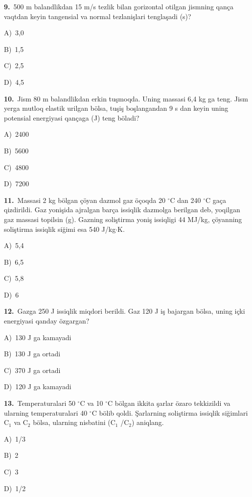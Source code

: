 \documentclass[11pt,a4paper]{article}
\newcommand{\opt}[2]{\hspace*{4mm}#1)\ #2\par}
\begin{document}
\noindent\begin{minipage}{\linewidth}
\textbf{9.}\ 500 m balandlikdan 15 m/s tezlik bilan gorizontal otilgan jismning qança vaqtdan keyin tangensial va normal tezlanişlari tenglaşadi (s)?\par\smallskip
\opt{A}{3,0}
\opt{B}{1,5}
\opt{C}{2,5}
\opt{D}{4,5}
\end{minipage}\vspace{9pt}\par
\noindent\begin{minipage}{\linewidth}
\textbf{10.}\ Jism 80 m balandlikdan erkin tuşmoqda. Uning massasi 6,4 kg ga teng. Jism yerga mutloq elastik urilgan bölsa, tuşiş boşlangandan 9 s dan keyin uning potensial energiyasi qançaga (J) teng böladi?\par\smallskip
\opt{A}{2400}
\opt{B}{5600}
\opt{C}{4800}
\opt{D}{7200}
\end{minipage}\vspace{9pt}\par
\noindent\begin{minipage}{\linewidth}
\textbf{11.}\ Massasi 2 kg bölgan çöyan dazmol gaz öçoqda 20 $^\circ$C dan 240 $^\circ$C gaça qizdirildi. Gaz yonişida ajralgan barça issiqlik dazmolga berilgan deb, yoqilgan gaz massasi topilsin (g). Gazning soliştirma yoniş issiqligi 44 MJ/kg, çöyanning soliştirma issiqlik siğimi esa 540 J/kg$\cdot$K.\par\smallskip
\opt{A}{5,4}
\opt{B}{6,5}
\opt{C}{5,8}
\opt{D}{6}
\end{minipage}\vspace{9pt}\par
\noindent\begin{minipage}{\linewidth}
\textbf{12.}\ Gazga 250 J issiqlik miqdori berildi. Gaz 120 J iş bajargan bölsa, uning içki energiyasi qanday özgargan?\par\smallskip
\opt{A}{130 J ga kamayadi}
\opt{B}{130 J ga ortadi}
\opt{C}{370 J ga ortadi}
\opt{D}{120 J ga kamayadi}
\end{minipage}\vspace{9pt}\par
\noindent\begin{minipage}{\linewidth}
\textbf{13.}\ Temperaturalari 50 $^\circ$C va 10 $^\circ$C bölgan ikkita şarlar özaro tekkizildi va ularning temperaturalari 40 $^\circ$C bölib qoldi. Şarlarning soliştirma issiqlik siğimlari C$_{1}$ va C$_{2}$ bölsa, ularning nisbatini (C$_{1}$ /C$_{2}$) aniqlang.\par\smallskip
\opt{A}{1/3}
\opt{B}{2}
\opt{C}{3}
\opt{D}{1/2}
\end{minipage}\vspace{9pt}\par
\end{document}
